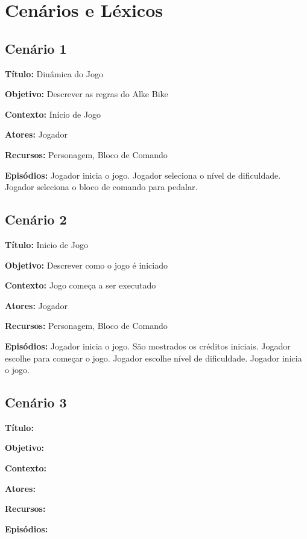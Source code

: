 \chapter[Cenários e Léxicos]{Cenários e Léxicos}

\section{Cenário 1}

\textbf{Título:} Dinâmica do Jogo 

\textbf{Objetivo:} Descrever as regras do Alke Bike 

\textbf{Contexto:} Início de Jogo

\textbf{Atores:} Jogador

\textbf{Recursos:} Personagem, Bloco de Comando

\textbf{Episódios:} Jogador inicia o jogo. Jogador seleciona o nível de dificuldade. Jogador seleciona o bloco de comando para pedalar.

\section{Cenário 2}

\textbf{Título:} Inicio de Jogo

\textbf{Objetivo:} Descrever como o jogo é iniciado 

\textbf{Contexto:} Jogo começa a ser executado 

\textbf{Atores:} Jogador

\textbf{Recursos:} Personagem, Bloco de Comando

\textbf{Episódios:} Jogador inicia o jogo. São mostrados os créditos iniciais. Jogador escolhe para começar o jogo. Jogador escolhe nível de dificuldade. Jogador inicia o jogo.

\section{Cenário 3}

\textbf{Título:} 

\textbf{Objetivo:}

\textbf{Contexto:}

\textbf{Atores:}

\textbf{Recursos:}

\textbf{Episódios:}